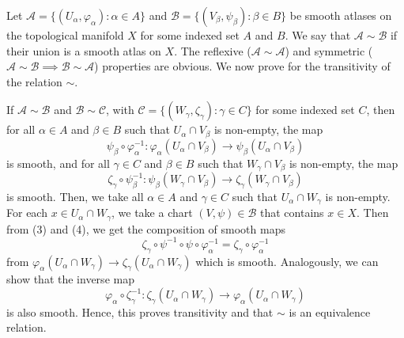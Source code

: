 
\begin{solution}
    Let $\mathcal{A}=\{(U_\alpha,\varphi_\alpha):
    \alpha\in A\}$ and 
    $\mathcal{B}=\{(V_\beta,\psi_\beta):
    \beta\in B\}$ be smooth atlases on the
    topological manifold $X$ for some indexed
    set $A$ and $B$. We say that $\mathcal{A}
    \sim\mathcal{B}$ if their union is a smooth
    atlas on $X$. The reflexive ($\mathcal{A}
    \sim\mathcal{A}$) and symmetric
    ($\mathcal{A}
    \sim\mathcal{B}\implies\mathcal{B}
    \sim\mathcal{A}$) properties are obvious.
    We now prove for the transitivity of the
    relation $\sim$.

    \vspace*{3mm}
    If $\mathcal{A}\sim\mathcal{B}$ and $\mathcal{B}
    \sim\mathcal{C}$, with
    $\mathcal{C}=\{(W_\gamma,\zeta_\gamma):
    \gamma\in C\}$ for some indexed set $C$, then
    for all $\alpha\in A$ and $\beta
        \in B$ such that $U_\alpha\cap V_\beta$
        is non-empty, the map
        \begin{equation}
            \psi_\beta\circ\varphi_\alpha^{-1}:
            \varphi_\alpha(U_\alpha\cap V_\beta)
            \to \psi_\beta(
                U_\alpha\cap V_\beta
            )
        \end{equation} is smooth, and
        for all $\gamma\in C$ and $\beta
        \in B$ such that $W_\gamma\cap V_\beta$
        is non-empty, the map
        \begin{equation}
            \zeta_\gamma\circ\psi_\beta^{-1}:
            \psi_\beta(W_\gamma\cap V_\beta)
            \to \zeta_\gamma(
                W_\gamma\cap V_\beta
            )
        \end{equation} is smooth.
        Then, we take all $\alpha\in A$ and
        $\gamma\in C$ such that $U_\alpha\cap
        W_\gamma$ is non-empty.
        For each $x\in U_\alpha\cap
        W_\gamma$, we take a chart $(V,\psi)\in
        \mathcal{B}$ that contains $x\in X$.
        Then from (3) and (4), we get the composition
        of smooth maps
        $$\zeta_\gamma\circ\psi^{-1}
        \circ \psi\circ\varphi_\alpha^{-1}
        =\zeta_\gamma\circ\varphi_\alpha^{-1}$$
        from $\varphi_\alpha(U_\alpha\cap
        W_\gamma)\to \zeta_\gamma(U_\alpha\cap
        W_\gamma)$ which is smooth. Analogously,
        we can show that the inverse map
        $$\varphi_\alpha\circ\zeta_\gamma^{-1}:
        \zeta_\gamma(U_\alpha\cap
        W_\gamma)
        \to \varphi_\alpha(
            U_\alpha\cap W_\gamma
        )$$ is also smooth. Hence, this proves
        transitivity and that $\sim$ is an
        equivalence relation.
\end{solution}